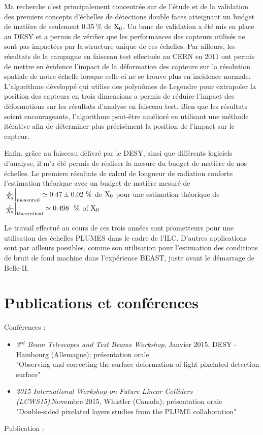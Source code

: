   Ma recherche c'est principalement concentrée sur de l'étude et de la validation des premiers concepts d'échelles de détections double faces atteignant un budget de matière de seulement $0.35~\%$ de $\rm{X_0}$.
  Un banc de validation a été mis en place au DESY et a permis de vérifier que les performances des capteurs utilisés ne sont pas impactées par la structure unique de ces échelles.
  Par ailleurs, les résultats de la campagne en faisceau test effectuée au CERN en 2011 ont permis de mettre en évidence l'impact de la déformation des capteurs sur la résolution spatiale de notre échelle lorsque celle-ci ne se trouve plus en incidence normale.
  L'algorithme développé qui utilise des polynômes de Legendre pour extrapoler la position des capteurs en trois dimensions a permis de réduire l'impact des déformations sur les résultats d'analyse en faisceau test.
  Bien que les résultats soient encourageants, l'algorithme peut-être amélioré en utilisant une méthode itérative afin de déterminer plus précisément la position de l'impact sur le capteur.
  
  Enfin, grâce au faisceau délivré par le DESY, ainsi que différents logiciels d'analyse, il m'a été permis de réaliser la mesure du budget de matière de nos échelles.
  Le premiers résultats de calcul de longueur de radiation conforte l'estimation théorique avec un budget de matière mesuré de  $\left. \frac{x}{X_0} \right|_{\rm{measured}} \simeq 0.47 \pm 0.02~\%$ de $\rm{X_0}$ pour une estimation théorique de $\left. \frac{x}{X_0}\right|_{\rm{theoretical}} \simeq 0.498~~\%$ of $\rm{X_0}$

  Le travail effectué au cours de ces trois années sont prometteurs pour une utilisation des échelles PLUMES dans le cadre de l'ILC.
  D'autres applications sont par ailleurs possibles, comme son utilisation pour l'estimation des conditions de bruit de fond machine dans l'expérience BEAST, juste avant le démarrage de Belle-II.

  \section*{Publications et conférences}

  Conférences :
  \begin{itemize}
    \item \textit{3$^{rd}$ Beam Telescopes and Test Beams Workshop}, Janvier 2015, DESY - Hambourg (Allemagne); présentation orale\\
    "Observing and correcting the surface deformation of light pixelated detection surface"
    \item \textit{2015 International Workshop on Future Linear Colliders (LCWS15)},Novembre 2015,  Whistler (Canada); présentation orale\\
    "Double-sided pixelated layers studies from the PLUME collaboration"
  \end{itemize}
  Publication :
  

